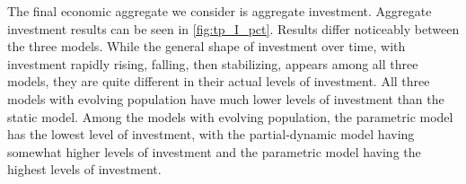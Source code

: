 \documentclass[10pt]{article}
\numberwithin{equation}{subsection}
\begin{document}
\par The final economic aggregate we consider is aggregate investment. Aggregate investment results can be seen in \autoref{fig:tp_I_pct}. Results differ noticeably between the three models. While the general shape of investment over time, with investment rapidly rising, falling, then stabilizing, appears among all three models, they are quite different in their actual levels of investment. All three models with evolving population have much lower levels of investment than the static model. Among the models with evolving population, the parametric model has the lowest level of investment, with the partial-dynamic model having somewhat higher levels of investment and the parametric model having the highest levels of investment.












\end{document}
